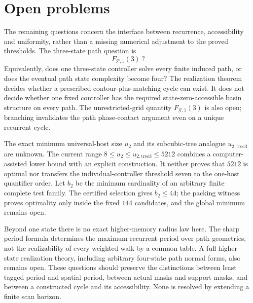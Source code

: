 \section{Open problems}\label{sec:open-problems}

The remaining questions concern the interface between recurrence, accessibility and
uniformity, rather than a missing numerical adjustment to the proved thresholds.
The three-state path question is
\[
 F_{\mathcal P,1}(3)\ ?
\]
Equivalently, does one three-state controller solve every finite induced path, or
does the eventual path state complexity become four? The realization theorem decides
whether a prescribed contour-plus-matching cycle can exist. It does not decide whether
one fixed controller has the required state-zero-accessible basin structure on every
path. The unrestricted-grid quantity $F_{\mathcal G,1}(3)$ is also open; branching
invalidates the path phase-contact argument even on a unique recurrent cycle.

The exact minimum universal-host size $u_2$ and its subcubic-tree analogue
$u_{2,\mathrm{tree3}}$ are unknown. The current range
$8\le u_2\le u_{2,\mathrm{tree3}}\le5212$ combines a computer-assisted lower bound
with an explicit construction. It neither proves that $5212$ is optimal nor transfers
the individual-controller threshold seven to the one-host quantifier order.
Let $b_2$ be the minimum cardinality of an arbitrary finite complete test family.
The certified selection gives $b_2\le44$; the packing witness proves optimality only
inside the fixed $144$ candidates, and the global minimum remains open.

Beyond one state there is no exact higher-memory radius law here. The sharp period
formula determines the maximum recurrent period over path geometries, not the
realizability of every weighted walk by a common table. A full higher-state realization
theory, including arbitrary four-state path normal forms, also remains open. These
questions should preserve the distinctions between least tagged period and spatial
period, between actual masks and support masks, and between a constructed cycle and
its accessibility. None is resolved by extending a finite scan horizon.
